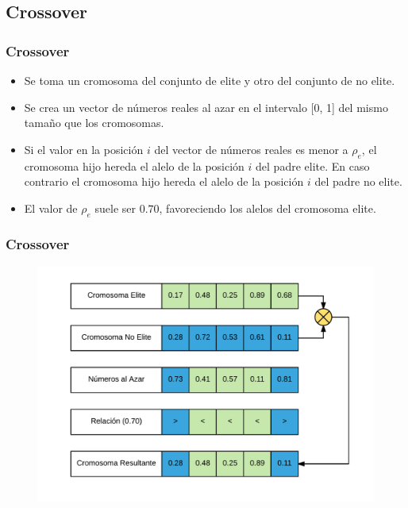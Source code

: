 \documentclass{beamer}
\begin{document}

\subsection{Crossover}

\begin{frame}
\frametitle{Crossover}

\begin{itemize}
    \item Se toma un cromosoma del conjunto de elite y otro del conjunto de no elite.
    \pause
    \item Se crea un vector de números reales al azar en el intervalo [0, 1] del mismo tamaño que los cromosomas.
    \pause
    \item Si el valor en la posición $i$ del vector de números reales es menor a $\rho_e$, el cromosoma hijo hereda el alelo de la posición $i$ del padre elite. En caso contrario el cromosoma hijo hereda el alelo de la posición $i$ del padre no elite.
    \pause
    \item El valor de $\rho_e$ suele ser $0.70$, favoreciendo los alelos del cromosoma elite.
\end{itemize}

\end{frame}


\begin{frame}
\frametitle{Crossover}

\begin{figure}[h]
	\centering
	\includegraphics[width=12cm]{BiasCrossover}
	\label{fig:BiasCrossover}
\end{figure}

\end{frame}
\end{document}
